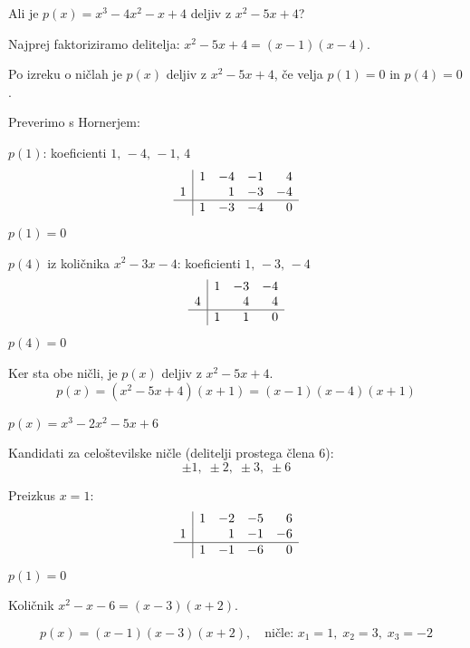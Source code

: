 \documentclass[a4paper,12pt]{letter}
\begin{document}
\begin{resitev*}
 
Ali je $p(x)=x^3-4x^2-x+4$ deljiv z $x^2-5x+4$?
 
Najprej faktoriziramo delitelja: $x^2-5x+4 = (x-1)(x-4)$.
 
Po izreku o ni\v{c}lah je $p(x)$ deljiv z $x^2-5x+4$, \v{c}e velja $p(1)=0$ in $p(4)=0$.
 
Preverimo s Hornerjem:
 
$p(1)$: koeficienti $1,\,-4,\,-1,\,4$
\[
\begin{array}{r|rrrr}
   & 1 & -4 & -1 & 4 \\
 1 &   &  1 & -3 & -4 \\
\hline
   & 1 & -3 & -4 &  0
\end{array}
\]
$p(1)=0$ \checkmark
 
$p(4)$ iz koli\v{c}nika $x^2-3x-4$: koeficienti $1,\,-3,\,-4$
\[
\begin{array}{r|rrr}
   & 1 & -3 & -4 \\
 4 &   &  4 &  4 \\
\hline
   & 1 &  1 &  0
\end{array}
\]
$p(4)=0$ \checkmark
 
Ker sta obe ni\v{c}li, je $p(x)$ deljiv z $x^2-5x+4$.
$$\boxed{p(x) = (x^2-5x+4)(x+1) = (x-1)(x-4)(x+1)}$$
 
\end{resitev*}
 
\begin{resitev*}
 
$p(x)=x^3-2x^2-5x+6$
 
Kandidati za celo\v{s}tevilske ni\v{c}le (delitelji prostega \v{c}lena $6$):
$$\pm1,\;\pm2,\;\pm3,\;\pm6$$
 
Preizkus $x=1$:
\[
\begin{array}{r|rrrr}
   & 1 & -2 & -5 & 6 \\
 1 &   &  1 & -1 & -6 \\
\hline
   & 1 & -1 & -6 &  0
\end{array}
\]
$p(1)=0$ \checkmark
 
Koli\v{c}nik $x^2-x-6 = (x-3)(x+2)$.
 
$$\boxed{p(x)=(x-1)(x-3)(x+2), \quad \text{ni\v{c}le: } x_1=1,\; x_2=3,\; x_3=-2}$$
 
\end{resitev*}
 
\end{document}
